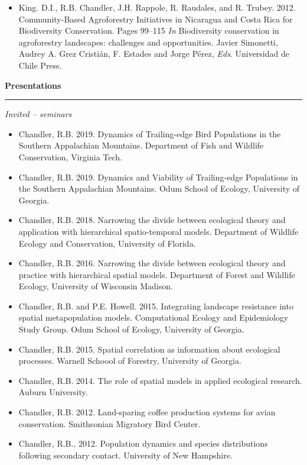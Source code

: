 \begin{itemize}
  \item King. D.I., R.B. Chandler, J.H. Rappole, R. Raudales, and
    R. Trubey. 2012. Community-Based
    Agroforestry Initiatives in Nicaragua and Costa Rica for
    Biodiversity Conservation. Pages 99--115 {\it In} Biodiversity
    conservation in agroforestry landscapes: challenges and
    opportunities. Javier Simonetti, Audrey A. Grez Cristi\'{a}n,
    F. Estades and Jorge P\'{e}rez, \emph{Eds}. Universidad de Chile Press.
\end{itemize}


\vspace{0.5cm}


{\large \bf Presentations} \\
\rule[3mm]{\textwidth}{0.3mm}

\emph{Invited -- seminars}

\begin{itemize}

\item Chandler, R.B. 2019. Dynamics of Trailing-edge Bird Populations
  in the Southern Appalachian Mountains. Department of Fish and
  Wildlife Conservation, Virginia Tech.

\item Chandler, R.B. 2019. Dynamics and Viability of Trailing-edge
  Populations in the Southern Appalachian Mountains. Odum School of
  Ecology, University of Georgia.

\item Chandler, R.B. 2018. Narrowing the divide between ecological
  theory and application with hierarchical spatio-temporal
  models. Department of Wildlife Ecology and Conservation, 
  University of Florida.

\item Chandler, R.B. 2016. Narrowing the divide between ecological
  theory and practice with hierarchical spatial models. Department of
  Forest and Wildlife Ecology, University of Wisconsin Madison. 

\item Chandler, R.B. and P.E. Howell. 2015. Integrating landscape
  resistance into spatial metapopulation models. Computational Ecology
  and Epidemiology Study Group. Odum School of Ecology, University of
  Georgia. 

\item Chandler, R.B. 2015. Spatial correlation as information about
  ecological processes. Warnell Schoool of Forestry, University of
  Georgia. 

\item Chandler, R.B. 2014. The role of spatial models in applied
  ecological research. Auburn University.

\item Chandler, R.B. 2012. Land-sparing coffee production systems for avian
  conservation. Smithsonian Migratory Bird Center. 

\item Chandler, R.B., 2012. Population dynamics and species distributions following
  secondary contact. University of New Hampshire.

\end{itemize}

